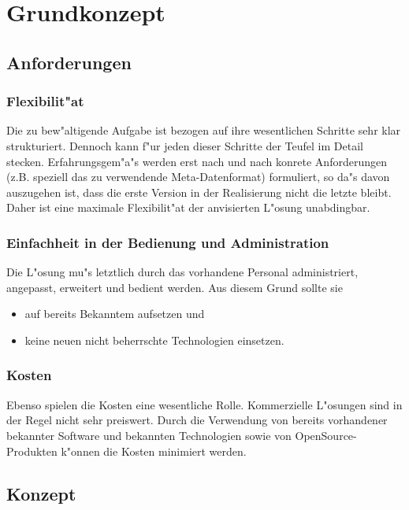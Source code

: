 \documentclass[11pt, twoside, a4paper, BCOR8mm, DIV12, bibtotoc,idxtotoc]{scrreprt}
\begin{document}
\chapter{Grundkonzept}


\section{Anforderungen}


\subsection{Flexibilit"at}

Die zu bew"altigende Aufgabe ist bezogen auf ihre wesentlichen
Schritte sehr klar strukturiert. Dennoch kann f"ur jeden dieser
Schritte der Teufel im Detail stecken. Erfahrungsgem"a"s werden erst
nach und nach konrete Anforderungen (z.B. speziell das zu verwendende
Meta-Datenformat) formuliert, so da"s davon auszugehen ist, dass die
erste Version in der Realisierung nicht die letzte bleibt. Daher ist
eine maximale Flexibilit"at der anvisierten L"osung unabdingbar.


\subsection{Einfachheit in der Bedienung und Administration}

Die L"osung mu"s letztlich durch das vorhandene Personal
administriert, angepasst, erweitert und bedient werden. Aus diesem
Grund sollte sie 

\begin{itemize}
\item auf bereits Bekanntem aufsetzen und
\item keine neuen nicht beherrschte Technologien einsetzen. 
\end{itemize}

\subsection{Kosten}

Ebenso spielen die Kosten eine wesentliche Rolle. Kommerzielle
L"osungen sind in der Regel nicht sehr preiswert. Durch die Verwendung
von bereits vorhandener bekannter Software und bekannten Technologien
sowie von OpenSource-Produkten k"onnen die Kosten minimiert werden.


\section{Konzept}
\end{document}
